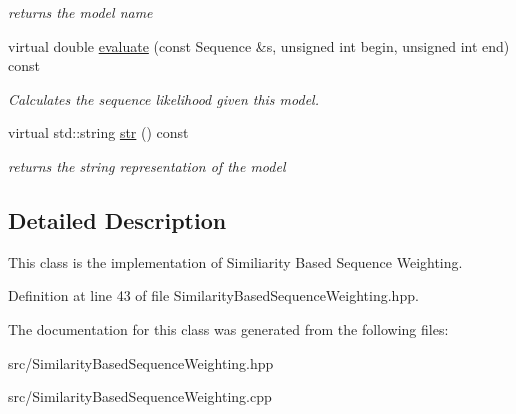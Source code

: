 \begin{DoxyCompactItemize}
\begin{DoxyCompactList}\small\item\em returns the model name \end{DoxyCompactList}\item 
\mbox{\label{classtops_1_1SimilarityBasedSequenceWeighting_a81c3ba3321c66f750d824a75205561b7}} 
virtual double \hyperlink{classtops_1_1SimilarityBasedSequenceWeighting_a81c3ba3321c66f750d824a75205561b7}{evaluate} (const Sequence \&s, unsigned int begin, unsigned int end) const
\begin{DoxyCompactList}\small\item\em Calculates the sequence likelihood given this model. \end{DoxyCompactList}\item 
\mbox{\label{classtops_1_1SimilarityBasedSequenceWeighting_ac74fcf24af9f53eed26d42aa60bf8978}} 
virtual std\+::string \hyperlink{classtops_1_1SimilarityBasedSequenceWeighting_ac74fcf24af9f53eed26d42aa60bf8978}{str} () const
\begin{DoxyCompactList}\small\item\em returns the string representation of the model \end{DoxyCompactList}\end{DoxyCompactItemize}


\subsection{Detailed Description}
This class is the implementation of Similiarity Based Sequence Weighting. 

Definition at line 43 of file Similarity\+Based\+Sequence\+Weighting.\+hpp.



The documentation for this class was generated from the following files\+:\begin{DoxyCompactItemize}
\item 
src/Similarity\+Based\+Sequence\+Weighting.\+hpp\item 
src/Similarity\+Based\+Sequence\+Weighting.\+cpp\end{DoxyCompactItemize}
